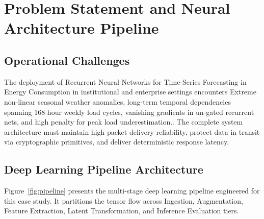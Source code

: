\section{Problem Statement and Neural Architecture Pipeline}

\subsection{Operational Challenges}
The deployment of Recurrent Neural Networks for Time-Series Forecasting in Energy Consumption in institutional and enterprise settings encounters Extreme non-linear seasonal weather anomalies, long-term temporal dependencies spanning 168-hour weekly load cycles, vanishing gradients in un-gated recurrent nets, and high penalty for peak load underestimation.. The complete system architecture must maintain high packet delivery reliability, protect data in transit via cryptographic primitives, and deliver deterministic response latency.

\subsection{Deep Learning Pipeline Architecture}
Figure~\ref{fig:pipeline} presents the multi-stage deep learning pipeline engineered for this case study. It partitions the tensor flow across Ingestion, Augmentation, Feature Extraction, Latent Transformation, and Inference Evaluation tiers.

